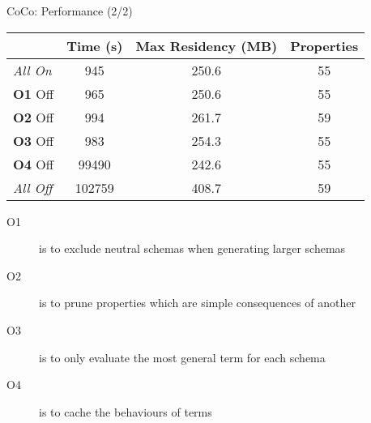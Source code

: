 \documentclass{beamer}
\begin{document}
\begin{frame}{CoCo: Performance \hfill \footnotesize (2/2)}
\begin{center}
    \begin{tabular}{lSSS} \toprule
      & {Time (s)} & {Max Residency (MB)} & {Properties} \\ \midrule
      \emph{All On}   &    945 & 250.6 & 55 \\
      \textbf{O1} Off &    965 & 250.6 & 55 \\
      \textbf{O2} Off &    994 & 261.7 & 59 \\
      \textbf{O3} Off &    983 & 254.3 & 55 \\
      \textbf{O4} Off &  99490 & 242.6 & 55 \\
      \emph{All Off}  & 102759 & 408.7 & 59 \\ \bottomrule
    \end{tabular}
\end{center}

  \raggedright \footnotesize
  \begin{description}
  \item[O1] is to exclude neutral schemas when generating larger schemas
  \item[O2] is to prune properties which are simple consequences of another
  \item[O3] is to only evaluate the most general term for each schema
  \item[O4] is to cache the behaviours of terms
  \end{description}
\end{frame}
\end{document}

